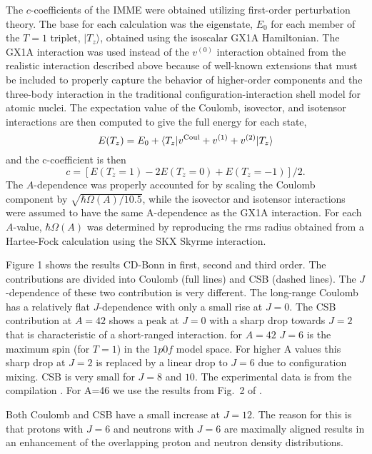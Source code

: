 \documentclass[twocolumn,aps,tightenlines,floatfix,showpacs]{revtex4}
\begin{document}
The $c$-coefficients of the IMME were obtained utilizing first-order
perturbation theory. The base for each calculation was the eigenstate,
$E_{0}$ for each member of the $T=1$ triplet, $ \vert T_{z} \rangle$,
obtained using the isoscalar GX1A Hamiltonian. The GX1A interaction
was used instead of the $v^{(0)}$ interaction obtained from the
realistic interaction described above because of well-known extensions
that must be included to properly capture the behavior of higher-order
components and the three-body interaction in the traditional
configuration-interaction shell model for atomic nuclei. The
expectation value of the Coulomb, isovector, and isotensor
interactions are then computed to give the full energy for each state,
\[
E(T_{z}) = E_{0} + \langle T_{z} \vert   v^{{\rm Coul}} + v^{(1)} + v^{(2)}\vert T_{z} \rangle
\]
and the c-coefficient is then
\[
c = [E(T_{z} =1) - 2E(T_{z} =0) + E(T_{z} =-1)]/2.
\]
The $A$-dependence was properly accounted for by scaling the Coulomb
component by $  \sqrt{\hbar\Omega(A)/10.5}  $, while the isovector and
isotensor interactions were assumed to have the same A-dependence as
the GX1A interaction. For each $A$-value, $\hbar\Omega(A)$ was
determined by reproducing the rms radius obtained from a Hartee-Fock
calculation using the SKX Skyrme interaction.

Figure 1 shows the results CD-Bonn in first, second and third order.
The contributions are divided into Coulomb (full lines)
and CSB (dashed lines). The $J$-dependence of these
two contribution is very different. The long-range Coulomb
has a relatively flat $J$-dependence with only
a small rise at $J=0$. The CSB contribution at $A=42$
shows a peak at $J=0$ with a sharp drop towards $J=2$
that is characteristic of a short-ranged interaction.
for $A=42$ $J=6$ is the maximum
spin (for $T=1$) in the $1p0f$ model space.
For higher A values this sharp drop at $  J=2  $ is replaced
by a linear drop to $J=6$ due to configuration mixing.
CSB is very small for $J=8$ and $10$.
The experimental data is from the compilation \cite{2013la}. 
For A=46 we use the results from Fig.~2 of \cite{2001ga}.

Both Coulomb and CSB have a small increase at $  J=12  $.
The reason for this is that
protons with $  J=6  $ and neutrons with $  J=6  $
are maximally aligned results in an enhancement of the
overlapping proton and neutron density distributions.
\end{document}
